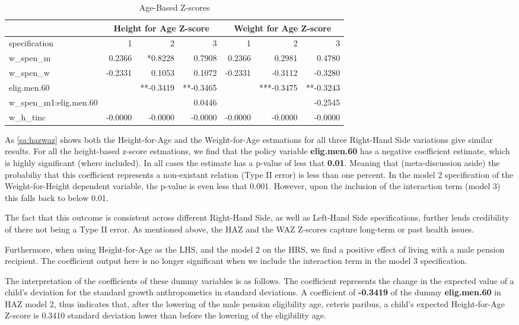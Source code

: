 \begin{refsection}
\begin{table}[!ht]
\centering
\caption{Age-Based Z-scores}
\label{sa:hazwaz}
\begin{tabular}{l|rrr|rrr}
& \multicolumn{3}{c}{Height for Age Z-score} & \multicolumn{3}{c}{Weight for Age Z-score}\\
\hline
specification & 1 & 2 & 3 & 1 & 2 & 3\\
\hline
w\_spen\_m & 0.2366 & *0.8228 & 0.7908 & 0.2366 & 0.2981 & 0.4780 \\
w\_spen\_w & -0.2331 & 0.1053 & 0.1072 & -0.2331 & -0.3112 & -0.3280 \\
elig.men.60 & & **-0.3419 & **-0.3465 & & ***-0.3475 & **-0.3243 \\
w\_spen\_m1:elig.men.60 & & & 0.0446 & & & -0.2545 \\
w\_h\_tinc & -0.0000 & -0.0000 & -0.0000 & -0.0000 & -0.0000 & -0.0000 \\
\end{tabular}
\end{table}

As \autoref{sa:hazwaz} shows both the Height-for-Age and the Weight-for-Age estmations for all three Right-Hand Side variations give similar results.
For all the height-based z-score estmations, we find that the policy variable \textbf{elig.men.60} has a negative coefficient estimate, which is highly significant (where included).
In all cases the estimate has a p-value of less that \textbf{0.01}.
Meaning that (meta-discussion aside) the probabiliy that this coefficient represents a non-existant relation (Type II error) is less than one percent.
In the model 2 specification of the Weight-for-Height dependent variable, the p-value is even less that 0.001.
However, upon the inclusion of the interaction term (model 3) this falls back to below 0.01.

The fact that this outcome is consistent across different Right-Hand Side,
as well as Left-Hand Side specifications, further lends credibility of there not being a Type II error.
As mentioned above, the HAZ and the WAZ Z-scores capture long-term or past health issues.

Furthermore, when using Height-for-Age as the LHS, and the model 2 on the HRS, we find a positive effect of living with a male pension recipient.
The coefficient output here is no longer significant when we include the interaction term in the model 3 specification.

The interpretation of the coefficients of these dummy variables is as follows.
The coefficient represents the change in the expected value of a child's deviation for the standard growth anthropometics in standard deviations. 
A coefficient of \textbf{-0.3419} of the dummy \textbf{elig.men.60} in HAZ model 2,  thus indicates that,
after the lowering of the male pension eligibility age, ceteris paribus, a child's expected Height-for-Age Z-score is 0.3410 standard deviation lower than before the lowering of the eligibility age.



\end{refsection}
